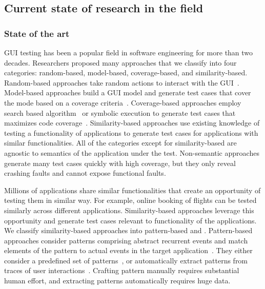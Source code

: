 \subsection{Current state of research in the field }







\subsubsection{State of the art}
GUI testing has been a popular field in software engineering for more than two decades. Researchers proposed many approaches that we classify into four categories:
 random-based, model-based, coverage-based, and  similarity-based.
Random-based approaches take random actions to interact with  the GUI~\cite{machiry:dynodroid:FSE:2013,vos:testar:ijismd:2015,ermuth:monkey:ISSTA:2016}.
Model-based approaches build a GUI model and generate test cases that cover the mode based on a coverage criteria~\cite{Nguyen:GUITAR:ASEJ:2014,Li:DroidiBot:ICSE-C:2017,Gu:PractivalTest:ICSE:2019,Choi:swift:OOPSLA:2013}. 
Coverage-based approaches employ search based algorithm~\cite{Gross:exist:ISSTA:2012,mahmood:evodroid:FSE:2014,dong:TimaMachine:ICSE:2020} or symbolic execution  to generate test cases that maximizes code coverage~\cite{Ganov:GUIsymbolic:FMSE:2009,cheng:guicat:ASE:2016,Anand:conc:FSE:2012}.
Similarity-based approaches use existing knowledge of testing a functionality of applications to generate test cases for applications with similar functionalities.
All of the categories except for similarity-based are agnostic to semantics of the application under the test. 
Non-semantic approaches generate many test cases quickly with high coverage, but they only reveal crashing faults and cannot expose functional faults.

\smallskip 
Millions of applications share similar functionalities that create an opportunity of testing them in similar way.
For example, online booking of flights can be tested similarly across different applications. 
Similarity-based approaches leverage this opportunity and generate test cases relevant to functionality of the applications.
We classify similarity-based approaches into pattern-based and \testreuse.
Pattern-based approaches consider patterns comprising abstract recurrent events and match  elements of the pattern to actual events in the target application~\cite{Moreira:pattern:ISSRE:2013,Morgado:Impact:HCI:2019}.
They either consider a predefined set of patterns~\cite{Mariani:Augusto:ICSE:2018,Hu:appflow:FSE:2018}, or automatically extract patterns from traces of user interactions~\cite{linares:mining:MSR:2015,mao:crowd:ASE:2017,Mao:UserPattern:JSS:2021}.
Crafting pattern manually requires substantial human effort, and extracting patterns automatically requires huge data.


